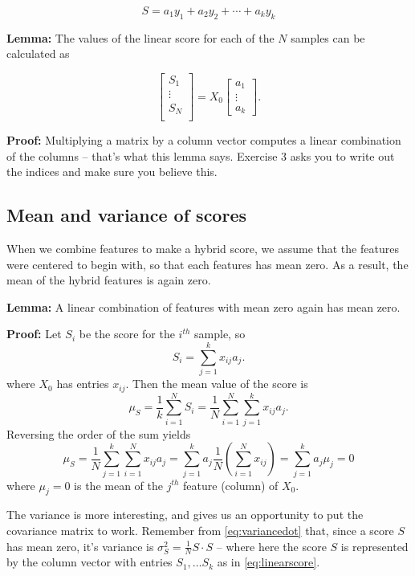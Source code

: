 \documentclass[
  oneside]{scrbook}
\begin{document}
\[
S = a_{1}y_{1}+a_{2}y_{2}+\cdots+a_{k}y_{k}
\]

\textbf{Lemma:} The values of the linear score for each of the \(N\)
samples can be calculated as

\begin{equation}
\left[\begin{matrix} S_{1} \\ \vdots \\ S_{N}\\ \end{matrix}\right] =
X_{0}\left[
\begin{matrix} a_{1} \\ \vdots \\ a_{k}\end{matrix}\right].
\label{eq:linearscore}\end{equation}

\textbf{Proof:} Multiplying a matrix by a column vector computes a
linear combination of the columns -- that's what this lemma says.
Exercise 3 asks you to write out the indices and make sure you believe
this.

\hypertarget{mean-and-variance-of-scores}{%
\subsection{Mean and variance of
scores}\label{mean-and-variance-of-scores}}

When we combine features to make a hybrid score, we assume that the
features were centered to begin with, so that each features has mean
zero. As a result, the mean of the hybrid features is again zero.

\textbf{Lemma:} A linear combination of features with mean zero again
has mean zero.

\textbf{Proof:} Let \(S_{i}\) be the score for the \(i^{th}\) sample, so
\[
S_{i} = \sum_{j=1}^{k} x_{ij}a_{j}.
\] where \(X_{0}\) has entries \(x_{ij}\). Then the mean value of the
score is \[
\mu_{S} = \frac{1}{k}\sum_{i=1}^{N} S_{i} = \frac{1}{N}\sum_{i=1}^{N}\sum_{j=1}^{k} x_{ij}a_{j}.
\] Reversing the order of the sum yields \[
\mu_{S} = \frac{1}{N}\sum_{j=1}^{k}\sum_{i=1}^{N} x_{ij}a_{j} = \sum_{j=1}^{k} a_{j}\frac{1}{N}(\sum_{i=1}^{N} x_{ij})=
\sum_{j=1}^{k}a_{j}\mu_{j}=0
\] where \(\mu_{j}=0\) is the mean of the \(j^{th}\) feature (column) of
\(X_{0}\).

The variance is more interesting, and gives us an opportunity to put the
covariance matrix to work. Remember from \ref{eq:variancedot} that,
since a score \(S\) has mean zero, it's variance is
\(\sigma_{S}^2=\frac{1}{N}S\cdot S\) -- where here the score \(S\) is
represented by the column vector with entries \(S_{1},\ldots S_{k}\) as
in \cref{eq:linearscore}.
\end{document}
